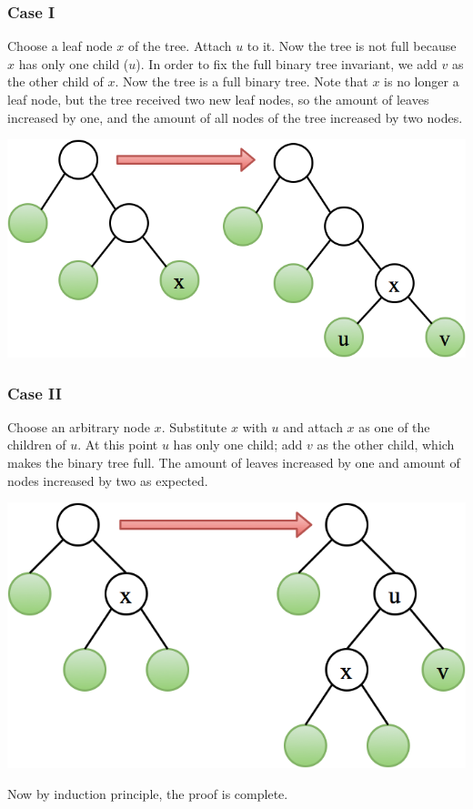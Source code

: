 \documentclass[10pt]{article}
\begin{document}
\subsubsection*{Case I} Choose a leaf node $x$ of the tree. Attach $u$ to it. Now the tree is not full because $x$ has only one child ($u$). In order to fix the full binary tree invariant, we add $v$ as the other child of $x$. Now the tree is a full binary tree. Note that $x$ is no longer a leaf node, but the tree received two new leaf nodes, so the amount of leaves increased by one, and the amount of all nodes of the tree increased by two nodes.
\begin{center}
\includegraphics[scale=0.3]{FullBinaryTreeCaseI}
\end{center}

\subsubsection*{Case II} Choose an arbitrary node $x$. Substitute $x$ with $u$ and attach $x$ as one of the children of $u$. At this point $u$ has only one child; add $v$ as the other child, which makes the binary tree full. The amount of leaves increased by one and amount of nodes increased by two as expected.
\begin{center}
\includegraphics[scale=0.3]{FullBinaryTreeCaseII}
\end{center}
Now by induction principle, the proof is complete.
\end{document}

